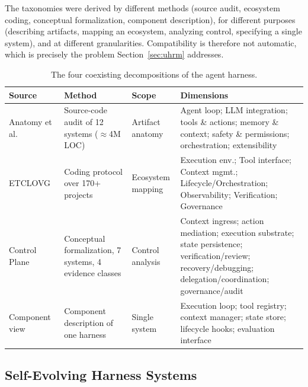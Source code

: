 \documentclass[conference]{IEEEtran}
\begin{document}
The taxonomies were derived by different methods (source audit, ecosystem coding, conceptual formalization, component description), for different purposes (describing artifacts, mapping an ecosystem, analyzing control, specifying a single system), and at different granularities. Compatibility is therefore not automatic, which is precisely the problem Section~\ref{sec:uhrm} addresses.

\begin{table}[t]
\caption{The four coexisting decompositions of the agent harness.}
\label{tab:taxonomies}
\centering
\footnotesize
\begin{tabular}{@{}p{2.6cm}p{4.3cm}p{4.5cm}p{4.6cm}@{}}
\toprule
\textbf{Source} & \textbf{Method} & \textbf{Scope} & \textbf{Dimensions} \\
\midrule
Anatomy et al.~\cite{b1} & Source-code audit of 12 systems ($\approx$4M LOC) & Artifact anatomy & Agent loop; LLM integration; tools \& actions; memory \& context; safety \& permissions; orchestration; extensibility \\
ETCLOVG~\cite{b2} & Coding protocol over 170+ projects & Ecosystem mapping & Execution env.; Tool interface; Context mgmt.; Lifecycle/Orchestration; Observability; Verification; Governance \\
Control Plane~\cite{b7} & Conceptual formalization, 7 systems, 4 evidence classes & Control analysis & Context ingress; action mediation; execution substrate; state persistence; verification/review; recovery/debugging; delegation/coordination; governance/audit \\
Component view~\cite{b2} & Component description of one harness & Single system & Execution loop; tool registry; context manager; state store; lifecycle hooks; evaluation interface \\
\bottomrule
\end{tabular}
\end{table}

\subsection{Self-Evolving Harness Systems}
\end{document}
